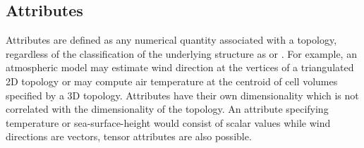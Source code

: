 \subsection{Attributes}
Attributes are defined as any numerical quantity associated with a
topology, regardless of the classification of the underlying structure
as \cgrid{} or \ugrid{}. For example, an atmospheric model may
estimate wind direction at the vertices of a triangulated 2D topology
or may compute air temperature at the centroid of cell volumes
specified by a 3D topology. Attributes have their own dimensionality
which is not correlated with the dimensionality of the topology. An
attribute specifying temperature or sea-surface-height would consist
of scalar values while wind directions are vectors, tensor attributes
are also possible.
